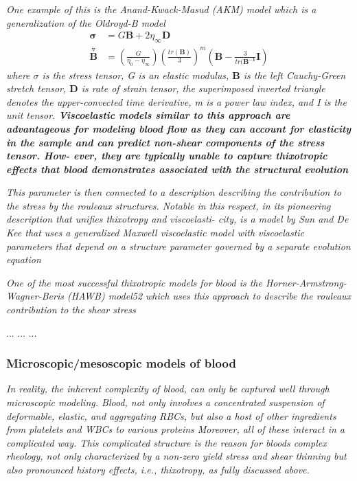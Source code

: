 \documentclass[11pt,letterpaper]{article}
\begin{document}
\textit{One example of this is the Anand-Kwack-Masud (AKM) model which is a generalization of the Oldroyd-B model
\begin{align}
    \bm{\sigma} &= G \bm{B} + 2\eta_{\infty} \bm{D} \\
   \overset{\triangledown}{\bm{B}} &= (\frac{G}{\eta_0-\eta_{\infty}})(\frac{tr(\bm{B})}{3})^m(\bm{B}-\frac{3}{tr(\bm{B^{-1}}}\bm{I})
\end{align}
where $\sigma$ is the stress tensor, G is an elastic modulus, $\bm{B}$ is the left Cauchy-Green stretch tensor, $\bm{D}$  is rate of strain tensor, the superimposed inverted triangle denotes the upper-convected time derivative, m is a power law index, and I is the unit tensor. \textbf{Viscoelastic models similar to this approach are advantageous for modeling blood flow as they can account for elasticity in the sample and can predict non-shear components of the stress tensor. How- ever, they are typically unable to capture thixotropic effects that blood demonstrates associated with the structural evolution}
}

\textit{This parameter is then connected to a description describing the contribution to the stress by the rouleaux structures. Notable in this respect, in its pioneering description that unifies thixotropy and viscoelasti- city, is a model by Sun and De Kee that uses a generalized Maxwell viscoelastic model with viscoelastic parameters that depend on a structure parameter governed by a separate evolution equation}

\textit{One of the most successful thixotropic models for blood is
the Horner-Armstrong-Wagner-Beris (HAWB) model52 which uses this approach to describe the rouleaux contribution to the shear stress }




...
...
...






\subsubsection*{Microscopic/mesoscopic models of blood}

\textit{In reality, the inherent complexity of blood, can only be captured well through microscopic modeling. Blood, not only involves a concentrated suspension of deformable, elastic, and aggregating RBCs, but also a host of other ingredients from platelets and WBCs to various proteins
Moreover, all of these interact in a complicated way. This complicated structure is the reason for bloods complex rheology, not only characterized by a non-zero yield stress and shear thinning but also pronounced history effects, i.e., thixotropy, as fully discussed above.}
\end{document}
